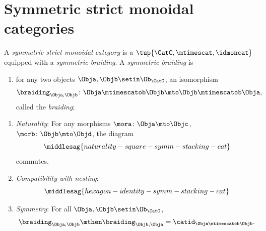 
\section{Symmetric strict monoidal categories}


\begin{ctdefinition}
    \label{def:sym-stacking-cat}
    A \emph{symmetric strict monoidal category} is a  $\tup{\CatC, \mtimescat, \idmoncat}$ equipped with a \emph{symmetric braiding}. A \emph{symmetric braiding} is

    \constit

    \begin{enumerate}
        \item for any two objects $\Obja, \Objb \setin \Ob_\CatC$, an isomorphism
              \begin{equation}
                  \braiding_{\Obja,\Objb} \colon \Obja \mtimescatob \Objb \mto \Objb \mtimescatob \Obja,
              \end{equation}
              called the \emph{braiding};
    \end{enumerate}

    \condit

    \begin{enumerate}
        \item \emph{Naturality}: For any morphisms $\mora \colon \Obja \mto \Objc$, $\morb \colon \Objb \mto \Objd$, the diagram
              \begin{equation}\label{eq:naturality-square-symm-stacking-cat}
                  \middlesag{naturality-square-symm-stacking-cat}
              \end{equation}
              commutes.
        \item \emph{Compatibility with nesting}:
              \begin{equation}\label{eq:hexagon-identity-symm-stacking-cat}
                  \middlesag{hexagon-identity-symm-stacking-cat}
              \end{equation}

        \item \emph{Symmetry}: For all $\Obja, \Objb \setin \Ob_\CatC$,
              \begin{equation}
                  \braiding_{\Obja, \Objb} \mthen \braiding_{\Objb, \Obja} = \catid_{\Obja \mtimescatob \Objb}.
              \end{equation}
    \end{enumerate}
\end{ctdefinition}

